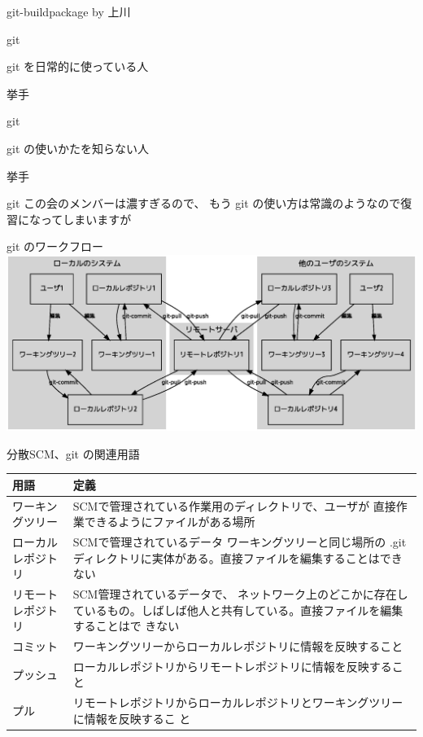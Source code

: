 \documentclass[cjk,dvipdfmx,12pt]{beamer}
\begin{document}
\begin{frame}

 git-buildpackage by 上川
\end{frame}


\begin{frame}{git}

 git を日常的に使っている人

 挙手
\end{frame}

\begin{frame}{git}

 git の使いかたを知らない人

 挙手

\end{frame}

\begin{frame}{git}
 この会のメンバーは濃すぎるので、
 もう git の使い方は常識のようなので復習になってしまいますが

\end{frame}

\begin{frame}{git のワークフロー}
\includegraphics[width=1\hsize]{image200704/git-repos.eps}
\end{frame}

\begin{frame}{分散SCM、git の関連用語}

{\tiny
\begin{tabular}{|l|p{15em}|}
\hline
\hline
用語 & 定義 \\
\hline
 ワーキングツリー & SCMで管理されている作業用のディレクトリで、ユーザが
 直接作業できるようにファイルがある場所\\
\hline
 ローカルレポジトリ & SCMで管理されているデータ
 ワーキングツリーと同じ場所の
 .git ディレクトリに実体がある。直接ファイルを編集することはできない\\
\hline
 リモートレポジトリ & SCM管理されているデータで、
 ネットワーク上のどこかに存在し
 ているもの。しばしば他人と共有している。直接ファイルを編集することはで
 きない
\\
\hline
 コミット & ワーキングツリーからローカルレポジトリに情報を反映すること\\
\hline
 プッシュ & ローカルレポジトリからリモートレポジトリに情報を反映するこ
 と\\
\hline
 プル & リモートレポジトリからローカルレポジトリとワーキングツリーに情報を反映するこ
 と\\
\hline
\hline
\end{tabular}
}

\end{frame}
\end{document}
